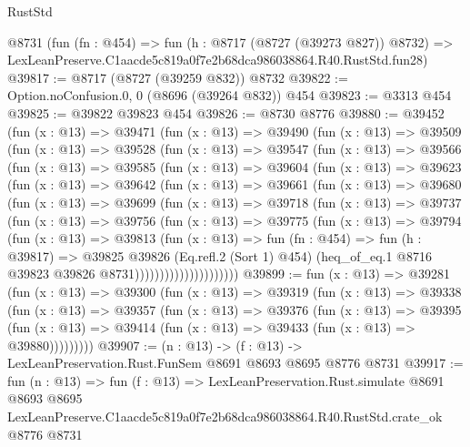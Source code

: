 \begin{lexlean}{RustStd}
\begin{coremodule}
    @8731
    (fun (fn : @454) =>
    fun (h : @8717 (@8727 (@39273 @827)) @8732) =>
    LexLeanPreserve.C1aacde5c819a0f7e2b68dca986038864.R40.RustStd.fun28)
@39817 := @8717 (@8727 (@39259 @832)) @8732
@39822 := Option.noConfusion.{0, 0} (@8696 (@39264 @832)) @454
@39823 := @3313 @454
@39825 := @39822 @39823 @454
@39826 := @8730 @8776
@39880 := @39452
    (fun (x : @13) =>
    @39471
      (fun (x : @13) =>
      @39490
        (fun (x : @13) =>
        @39509
          (fun (x : @13) =>
          @39528
            (fun (x : @13) =>
            @39547
              (fun (x : @13) =>
              @39566
                (fun (x : @13) =>
                @39585
                  (fun (x : @13) =>
                  @39604
                    (fun (x : @13) =>
                    @39623
                      (fun (x : @13) =>
                      @39642
                        (fun (x : @13) =>
                        @39661
                          (fun (x : @13) =>
                          @39680
                            (fun (x : @13) =>
                            @39699
                              (fun (x : @13) =>
                              @39718
                                (fun (x : @13) =>
                                @39737
                                  (fun (x : @13) =>
                                  @39756
                                    (fun (x : @13) =>
                                    @39775
                                      (fun (x : @13) =>
                                      @39794
                                        (fun (x : @13) =>
                                        @39813
                                          (fun (x : @13) =>
                                          fun (fn : @454) =>
                                          fun (h : @39817) =>
                                          @39825
                                            @39826
                                            (Eq.refl.{2} (Sort 1) @454)
                                            (heq_of_eq.{1}
                                              @8716
                                              @39823
                                              @39826
                                              @8731)))))))))))))))))))))
@39899 := fun (x : @13) =>
  @39281
    (fun (x : @13) =>
    @39300
      (fun (x : @13) =>
      @39319
        (fun (x : @13) =>
        @39338
          (fun (x : @13) =>
          @39357
            (fun (x : @13) =>
            @39376
              (fun (x : @13) =>
              @39395
                (fun (x : @13) => @39414 (fun (x : @13) => @39433 (fun (x : @13) => @39880)))))))))
@39907 := (n : @13) -> (f : @13) -> LexLeanPreservation.Rust.FunSem @8691 @8693 @8695 @8776 @8731
@39917 := fun (n : @13) =>
  fun (f : @13) =>
  LexLeanPreservation.Rust.simulate
    @8691
    @8693
    @8695
    LexLeanPreserve.C1aacde5c819a0f7e2b68dca986038864.R40.RustStd.crate_ok
    @8776
    @8731
\end{coremodule}
\end{lexlean}
